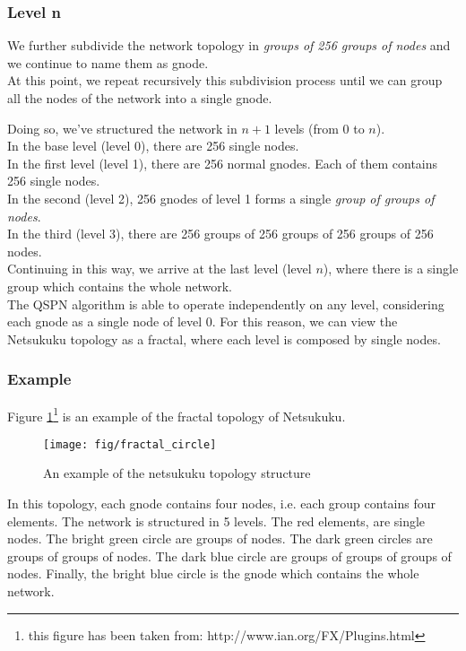 \documentclass[a4paper]{article}
\newcommand{\href}[2]{ #1 }
\begin{document}
\subsubsection{Level n}
We further subdivide the network topology in \emph{groups of 256 groups of nodes}
and we continue to name them as gnode.\\
At this point, we repeat recursively this subdivision process until
we can group all the nodes of the network into a single gnode.

Doing so, we've structured the network in $n+1$ levels (from $0$ to $n$).\\
In the base level (level 0), there are 256 single nodes.\\
In the first level (level 1), there are 256 normal gnodes. Each of them
contains 256 single nodes.\\
In the second (level 2), 256 gnodes of level 1 forms a single \emph{group of
groups of nodes}.\\
In the third (level 3), there are 256 groups of 256 groups of 256 groups of
256 nodes.\\
Continuing in this way, we arrive at the last level (level $n$), where there
is a single group which contains the whole network.\\

The QSPN algorithm is able to operate independently on any level,
considering each gnode as a single node of level 0.
For this reason, we can view the Netsukuku topology as a fractal, where each
level is composed by single nodes.

\subsubsection*{Example}

Figure \ref{fig:fract_circle}\footnote{this figure has been taken from:
\href{http://www.ian.org/FX/Plugins.html}{http://www.ian.org/FX/Plugins.html}}
is an example of the fractal topology of Netsukuku.

\begin{figure}[h]
	\begin{center}
		\texttt{[image: fig/fractal\_circle]}
	\end{center}
	\caption{An example of the netsukuku topology structure}
	\label{fig:fract_circle}
\end{figure}

In this topology, each gnode contains four nodes, i.e. each group contains
four elements. The network is structured in 5 levels. The red elements, are single
nodes. The bright green circle are groups of nodes. The dark green circles are
groups of groups of nodes. The dark blue circle are groups of groups of groups of
nodes. Finally, the bright blue circle is the gnode which contains the whole
network.
\end{document}
